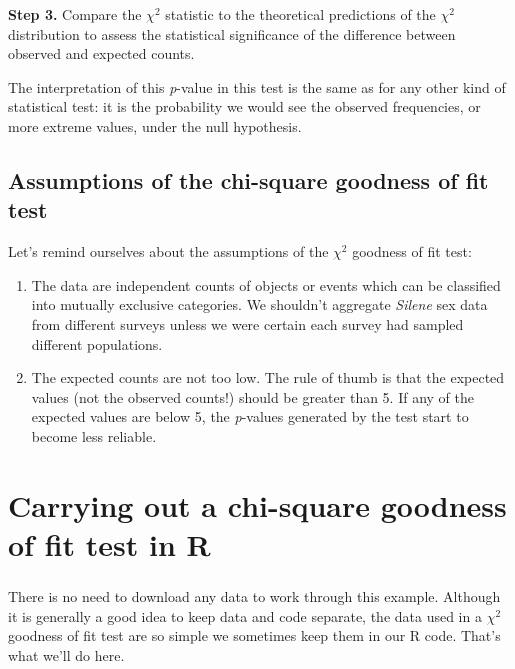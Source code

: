 \documentclass[
]{book}
\newenvironment{greybox}{
  \definecolor{shadecolor}{rgb}{0.95,0.95,0.95}  %
  \color{black}
  \begin{shaded}}
 {\end{shaded}}
\newenvironment{infobox}[1]
  {
  \begin{itemize}
  \renewcommand{\labelitemi}{
    \raisebox{-.7\height}[0pt][0pt]{
      {\setkeys{Gin}{width=3em,keepaspectratio}
        \texttt{[image: images/\#1]}}
    }
  }
  \setlength{\fboxsep}{1em}
  \begin{greybox}
  \item
  }
  {
  \end{greybox}
  \end{itemize}
  }
\begin{document}
\textbf{Step 3.} Compare the \(\chi^{2}\) statistic to the theoretical predictions of the \(\chi^{2}\) distribution to assess the statistical significance of the difference between observed and expected counts.

The interpretation of this \emph{p}-value in this test is the same as for any other kind of statistical test: it is the probability we would see the observed frequencies, or more extreme values, under the null hypothesis.

\hypertarget{assumptions-of-the-chi-square-goodness-of-fit-test}{%
\subsection{Assumptions of the chi-square goodness of fit test}\label{assumptions-of-the-chi-square-goodness-of-fit-test}}

Let's remind ourselves about the assumptions of the \(\chi^{2}\) goodness of fit test:

\begin{enumerate}
\def\labelenumi{\arabic{enumi}.}
\item
  The data are independent counts of objects or events which can be classified into mutually exclusive categories. We shouldn't aggregate \emph{Silene} sex data from different surveys unless we were certain each survey had sampled different populations.
\item
  The expected counts are not too low. The rule of thumb is that the expected values (not the observed counts!) should be greater than 5. If any of the expected values are below 5, the \emph{p}-values generated by the test start to become less reliable.
\end{enumerate}

\hypertarget{carrying-out-a-chi-square-goodness-of-fit-test-in-r}{%
\section{Carrying out a chi-square goodness of fit test in R}\label{carrying-out-a-chi-square-goodness-of-fit-test-in-r}}

\begin{infobox}{action}

\hypertarget{section-18}{%
\subsubsection*{}\label{section-18}}

There is no need to download any data to work through this example. Although it is generally a good idea to keep data and code separate, the data used in a \(\chi^{2}\) goodness of fit test are so simple we sometimes keep them in our R code. That's what we'll do here.

\end{infobox}
\end{document}
